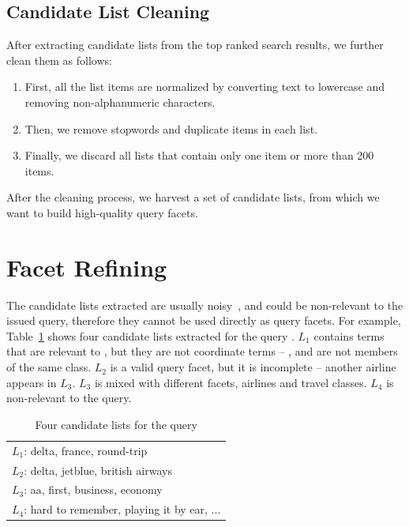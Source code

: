 \subsection{Candidate List Cleaning}
After extracting candidate lists from the top ranked search results, we further clean them as follows:
\begin{enumerate}[label={(\arabic*)}]
 \item First, all the list items are normalized by converting text to lowercase and removing non-alphanumeric characters.
 \item Then, we remove stopwords and duplicate items in each list.
 \item Finally, we discard all lists that contain only one item or more than 200 items. 
\end{enumerate}

After the cleaning process, we harvest a set of candidate lists, from which we want to build high-quality query facets. 

\section{Facet Refining}
\label{sec:facet-refine}
The candidate lists extracted are usually noisy~\cite{zhang2009employing},
and could be non-relevant to the issued query, therefore they cannot be used directly as query facets. For example, Table~\ref{tab:facet-candidates} shows four candidate lists extracted for the query . $L_1$ contains terms that are relevant to , but they are not coordinate terms -- ,  and  are not members of the same class. 
$L_2$ is a valid query facet, but it is incomplete -- another airline  appears in $L_3$. $L_3$ is mixed with different facets, airlines and travel classes. $L_4$ is non-relevant to the query. 
\begin{table}[!ht]
\centering
\caption{Four candidate lists for the query }
\label{tab:facet-candidates}
\begin{tabular}{|l|} \hline
$L_1$: delta, france, round-trip\\
$L_2$: delta, jetblue, british airways\\ 
$L_3$: aa, first, business, economy\\
$L_4$: hard to remember, playing it by ear, ...\\
\hline
\end{tabular}
\end{table}


